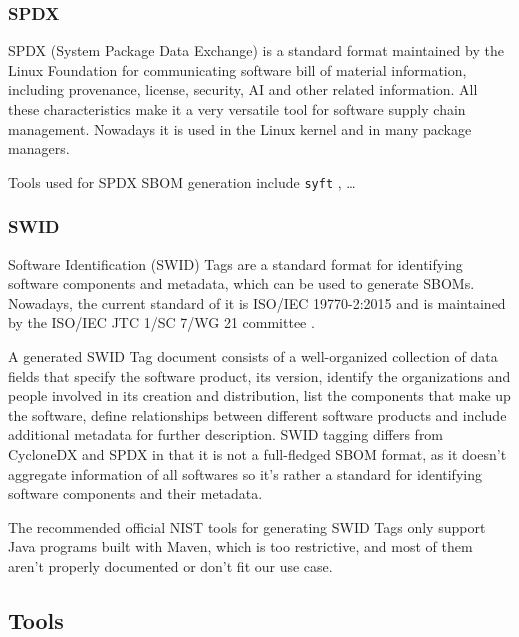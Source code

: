 \subsubsection{SPDX} \label{dataset:standard:spdx}

SPDX (System Package Data Exchange) \cite{standards:sbom:spdx} is a standard format maintained by the Linux Foundation for communicating software bill of material information, including provenance, license, security, AI and other related information.
All these characteristics make it a very versatile tool for software supply chain management. Nowadays it is used in the Linux kernel and in many package managers.

Tools used for SPDX SBOM generation include \verb|syft| \cite{repository:cyclonedx:syft}, \dots

\subsubsection{SWID} \label{dataset:standard:swid}

Software Identification (SWID) Tags \cite{standards:sbom:swid} are a standard format for identifying software components and metadata, which can be used to generate SBOMs. Nowadays, the current standard of it is ISO/IEC 19770-2:2015 \cite{standards:swid:iso19770-2:2015} and is maintained by the ISO/IEC JTC 1/SC 7/WG 21 committee \cite{standards:swid:committee}.

A generated SWID Tag document consists of a well-organized collection of data fields that specify the software product, its version, identify the organizations and people involved in its creation and distribution, list the components that make up the software, define relationships between different software products and include additional metadata for further description.
SWID tagging differs from CycloneDX and SPDX in that it is not a full-fledged SBOM format, as it doesn't aggregate information of all softwares so it's rather a standard for identifying software components and their metadata.

The recommended official NIST tools for generating SWID Tags only support Java programs built with Maven, which is too restrictive, and most of them aren't properly documented or don't fit our use case.


\subsection{Tools} \label{dataset:tools}

